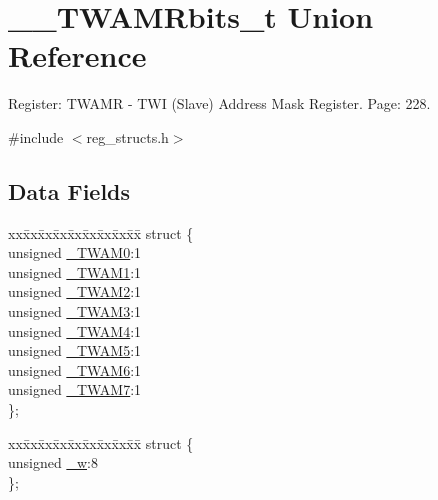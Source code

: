 \hypertarget{union_____t_w_a_m_rbits__t}{\section{\+\_\+\+\_\+\+T\+W\+A\+M\+Rbits\+\_\+t Union Reference}
\label{union_____t_w_a_m_rbits__t}
}


Register\+: T\+W\+A\+M\+R -\/ T\+W\+I (Slave) Address Mask Register. Page\+: 228.  




{\ttfamily \#include $<$reg\+\_\+structs.\+h$>$}

\subsection*{Data Fields}
\begin{DoxyCompactItemize}
\item 
\begin{tabbing}
xx\=xx\=xx\=xx\=xx\=xx\=xx\=xx\=xx\=\kill
struct \{\\
\>unsigned \hyperlink{union_____t_w_a_m_rbits__t_a71109f333587be8e0f9852d54b33d887}{\_TWAM0}:1\\
\>unsigned \hyperlink{union_____t_w_a_m_rbits__t_a6cf5c33b2cb3ee7d63b80f7e30876fde}{\_TWAM1}:1\\
\>unsigned \hyperlink{union_____t_w_a_m_rbits__t_a8f8aae98148277813d2cabd9fbcc6fc6}{\_TWAM2}:1\\
\>unsigned \hyperlink{union_____t_w_a_m_rbits__t_adc9a2529afcb8c0585172528cdf42f04}{\_TWAM3}:1\\
\>unsigned \hyperlink{union_____t_w_a_m_rbits__t_a047c430e37fff2a555ccdba668d8a6c9}{\_TWAM4}:1\\
\>unsigned \hyperlink{union_____t_w_a_m_rbits__t_acfbe4b6b56eaa55b381aaf817406965e}{\_TWAM5}:1\\
\>unsigned \hyperlink{union_____t_w_a_m_rbits__t_ac7b8164dafdc0140a59c6c4e2aa717ab}{\_TWAM6}:1\\
\>unsigned \hyperlink{union_____t_w_a_m_rbits__t_a5f49b853c799bcc21768ab54ca1217c5}{\_TWAM7}:1\\
\}; \\

\end{tabbing}\item 
\begin{tabbing}
xx\=xx\=xx\=xx\=xx\=xx\=xx\=xx\=xx\=\kill
struct \{\\
\>unsigned \hyperlink{union_____t_w_a_m_rbits__t_a8b46c36d09399d623611733addb85dc8}{\_w}:8\\
\}; \\

\end{tabbing}\end{DoxyCompactItemize}


